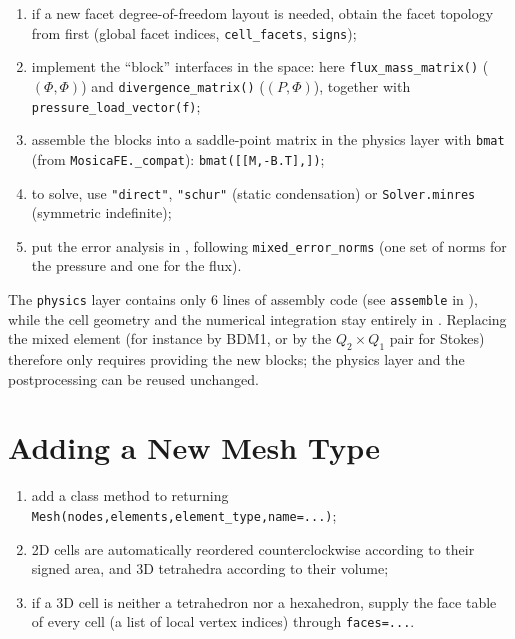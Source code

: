 \documentclass[11pt,oneside]{book}
\theoremstyle{definition}
\theoremstyle{plain}
\newenvironment{important}{%
  \begin{tcolorbox}[colback=blue!5,colframe=blue!45,title=Key Point,fonttitle=\bfseries]%
}{%
  \end{tcolorbox}%
}
\newcommand{\code}[1]{\texttt{#1}}
\begin{document}
\begin{enumerate}[label=(\arabic*),itemsep=0.2em]
  \item if a new facet degree-of-freedom layout is needed, obtain the facet topology
        from  first (global facet indices, \code{cell\_\allowbreak facets},
        \code{signs});
  \item implement the ``block'' interfaces in the space: here
        \code{flux\_\allowbreak mass\_\allowbreak matrix()} ($(\Phi,\Phi)$) and \code{divergence\_\allowbreak matrix()}
        ($(P,\Phi)$), together with \code{pressure\_\allowbreak load\_\allowbreak vector(f)};
  \item assemble the blocks into a saddle-point matrix in the physics layer with
        \code{bmat} (from \code{MosicaFE.\_\allowbreak compat}):
        \code{bmat([[M,\allowbreak  -B.T],\allowbreak  [B,\allowbreak  None]])};
  \item to solve, use \code{"direct"}, \code{"schur"} (static condensation) or
        \code{Solver.minres} (symmetric indefinite);
  \item put the error analysis in , following
        \code{mixed\_\allowbreak error\_\allowbreak norms} (one set of norms for the pressure and one for the
        flux).
\end{enumerate}

\begin{important}
The \code{physics} layer contains only 6 lines of assembly code (see \code{assemble}
in ), while the cell geometry and the numerical
integration stay entirely in . Replacing the mixed element (for
instance by BDM1, or by the $Q_2\times Q_1$ pair for Stokes) therefore only requires
providing the new blocks; the physics layer and the postprocessing can be reused
unchanged.
\end{important}

\section{Adding a New Mesh Type}

\begin{enumerate}[label=(\arabic*),itemsep=0.2em]
  \item add a class method to  returning
        \code{Mesh(nodes,\allowbreak  elements,\allowbreak  element\_\allowbreak type,\allowbreak  name=...)};
  \item 2D cells are automatically reordered counterclockwise according to their
        signed area, and 3D tetrahedra according to their volume;
  \item if a 3D cell is neither a tetrahedron nor a hexahedron, supply the face table
        of every cell (a list of local vertex indices) through \code{faces=...}.
\end{enumerate}
\end{document}
